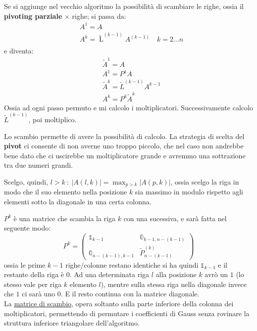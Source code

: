 \documentclass{article}
\begin{document}
Se si aggiunge nel vecchio algoritmo la possibilità di scambiare le righe, ossia il \textbf{pivoting parziale} $\times$ righe; si passa da:
\begin{align*}
     & A^1=A                                                             \\
     & A^k=\widetilde{\operatorname{L}}^{(k-1)}A^{(k-1)}\quad k=2\dots n \\
\end{align*}
e diventa:
\begin{align*}
     & \widetilde{A}^1=A                            \\
     & A^1=P^1A                                     \\
     & \widetilde{A}^k=\widetilde{L}^{(k-1)}A^{k-1} \\
     & A^k=P^k\widetilde{A}^k
\end{align*}
Ossia ad ogni passo permuto e mi calcolo i moltiplicatori. Successivamente calcolo $\widetilde{L}^{(k-1)}$, poi moltiplico.

Lo scambio permette di avere la possibilità di calcolo. La strategia di scelta del \textbf{pivot} ci consente di non averne uno troppo piccolo, che nel caso non andrebbe bene
dato che ci uscirebbe un moltiplicatore grande e avremmo una sottrazione tra due numeri grandi.

Scelgo, quindi, $l>k\ :\ \left|A(l,k)\right|=\max_{p>k}\left|A(p,k)\right|$, ossia scelgo la riga in modo che il suo elemento nella posizione $k$ sia massimo in modulo rispetto agli elementi
sotto la diagonale in una certa colonna.

$P^k$ è una matrice che scambia la riga $k$ con una sucessiva, e sarà fatta nel seguente modo:
\[P^k=\begin{pmatrix}
        \mathbb 1_{k-1}         & \mathbb 0_{k-1,n-(k-1)}       \\
        \mathbb 0_{n-(k-1),k-1} & \widetilde{P}^{(k)}_{n-(k-1)}
    \end{pmatrix}\]
ossia le prime $k-1$ righe/colonne restano identiche si ha quindi $\mathbb 1_{k-1}$ e il restante della riga è $0$.
Ad una determinata riga $l$ alla posizione $k$ avrò un $1$ (lo stesso vale per riga $k$ elemento $l$), mentre sulla stessa riga nella diagonale invece che $1$ ci sarà uno $0$.
E il resto continua con la matrice diagonale.\\
La \underline{matrice di scambio}, opera soltanto sulla parte inferiore della colonna dei moltiplicatori,
permettendo di permutare i coefficienti di Gauss senza rovinare la struttura inferiore triangolare dell'algoritmo.
\end{document}
